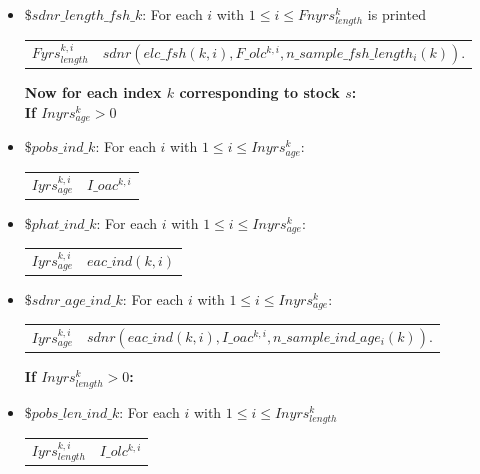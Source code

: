 \documentclass{article}
\begin{document}
\begin{itemize}
\item $\$ sdnr\_length\_fsh\_k$: For each $i$ with $1\leq i \leq Fnyrs^k_{length}$ is printed
\begin{center}
    \begin{tabular}{c c}
       $Fyrs^{k,i}_{length}$  &  $sdnr( elc\_fsh(k,i),F\_olc^{k,i},n\_sample\_fsh\_length_i(k))$.\\
\end{tabular}
\end{center}

\textbf{Now for each index $k$ corresponding to stock $s$:}\\
\textbf{If $Inyrs^k_{age}>0$}

\item $\$ pobs\_ind\_k$: For each $i$ with $1\leq i \leq Inyrs^k_{age}$:
\begin{center}
    \begin{tabular}{c c}
        $Iyrs^{k,i}_{age}$ & $I\_oac^{k,i}$ \\ 
    \end{tabular}
\end{center}

\item $\$ phat\_ind\_k$: For each $i$ with $1\leq i \leq Inyrs^k_{age}$:
\begin{center}
    \begin{tabular}{c c}
        $Iyrs^{k,i}_{age}$ & $eac\_ind(k,i)$ \\ 
    \end{tabular}
\end{center}

\item $\$ sdnr\_age\_ind\_k$: For each $i$ with $1\leq i \leq Inyrs^k_{age}$:
\begin{center}
    \begin{tabular}{c c}
        $Iyrs^{k,i}_{age}$ & $sdnr( eac\_ind(k,i),I\_oac^{k,i},n\_sample\_ind\_age_i(k)) $. \\ 
    \end{tabular}
\end{center}
\textbf{If $Inyrs^k_{length}>0$:}

\item $\$ pobs\_len\_ind\_k$: For each $i$ with $1\leq i \leq Inyrs^k_{length}$
\begin{center}
    \begin{tabular}{c c}
       $Iyrs^{k,i}_{length}$  &  $I\_olc^{k,i}$\\
         

\end{tabular}
\end{center}
\end{itemize}
\end{document}
